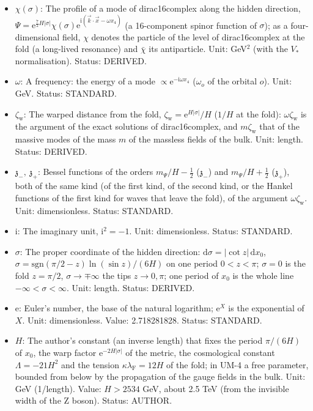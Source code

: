 \documentclass[
  10pt,
]{article}
\providecommand{\tightlist}{%
  \setlength{\itemsep}{0pt}\setlength{\parskip}{0pt}}
\begin{document}
\begin{itemize}
\tightlist
\item
  \(\chi(\sigma)\): The profile of a mode of dirac16complex along the
  hidden direction,
  \(\Psi = \mathrm{e}^{\frac72H\lvert\sigma\rvert}\chi(\sigma)\mathrm{e}^{\mathrm{i}(\vec k\cdot\vec x - \omega x_4)}\)
  (a 16-component spinor function of \(\sigma\)); as a four-dimensional
  field, \(\chi\) denotes the particle of the level of dirac16complex at
  the fold (a long-lived resonance) and \(\bar\chi\) its antiparticle.
  Unit: GeV\(^{2}\) (with the \(V_*\) normalisation). Status: DERIVED.
\item
  \(\omega\): A frequency: the energy of a mode
  \(\propto \mathrm{e}^{-\mathrm{i}\omega x_4}\) (\(\omega_o\) of the
  orbital \(o\)). Unit: GeV. Status: STANDARD.
\item
  \(\zeta_{\mathrm{w}}\): The warped distance from the fold,
  \(\zeta_{\mathrm{w}} = \mathrm{e}^{H\lvert\sigma\rvert}/H\) (\(1/H\)
  at the fold): \(\omega\zeta_{\mathrm{w}}\) is the argument of the
  exact solutions of dirac16complex, and \(m\zeta_{\mathrm{w}}\) that of
  the massive modes of the mass \(m\) of the massless fields of the
  bulk. Unit: length. Status: DERIVED.
\item
  \(\mathfrak{z}_-,\ \mathfrak{z}_+\): Bessel functions of the orders
  \(m_\Psi/H - \frac12\) (\(\mathfrak{z}_-\)) and \(m_\Psi/H + \frac12\)
  (\(\mathfrak{z}_+\)), both of the same kind (of the first kind, of the
  second kind, or the Hankel functions of the first kind for waves that
  leave the fold), of the argument \(\omega\zeta_{\mathrm{w}}\). Unit:
  dimensionless. Status: STANDARD.
\item
  \(\mathrm{i}\): The imaginary unit, \(\mathrm{i}^2 = -1\). Unit:
  dimensionless. Status: STANDARD.
\item
  \(\sigma\): The proper coordinate of the hidden direction:
  \(\mathrm{d}\sigma = \lvert\cot z\rvert\,\mathrm{d}x_0\),
  \(\sigma = \mathrm{sgn}(\pi/2 - z)\ln(\sin z)/(6H)\) on one period
  \(0 < z < \pi\); \(\sigma = 0\) is the fold \(z = \pi/2\),
  \(\sigma \to \mp\infty\) the tips \(z \to 0, \pi\); one period of
  \(x_0\) is the whole line \(-\infty < \sigma < \infty\). Unit: length.
  Status: DERIVED.
\item
  \(\mathrm{e}\): Euler's number, the base of the natural logarithm;
  \(\mathrm{e}^{X}\) is the exponential of \(X\). Unit: dimensionless.
  Value: 2.718281828. Status: STANDARD.
\item
  \(H\): The author's constant (an inverse length) that fixes the period
  \(\pi/(6H)\) of \(x_0\), the warp factor
  \(\mathrm{e}^{-2H\lvert\sigma\rvert}\) of the metric, the cosmological
  constant \(\Lambda = -21H^2\) and the tension
  \(\kappa\lambda_{\mathrm{F}} = 12H\) of the fold; in UM-4 a free
  parameter, bounded from below by the propagation of the gauge fields
  in the bulk. Unit: GeV (1/length). Value: \(H > 2534\) GeV, about 2.5
  TeV (from the invisible width of the Z boson). Status: AUTHOR.
\end{itemize}
\end{document}
